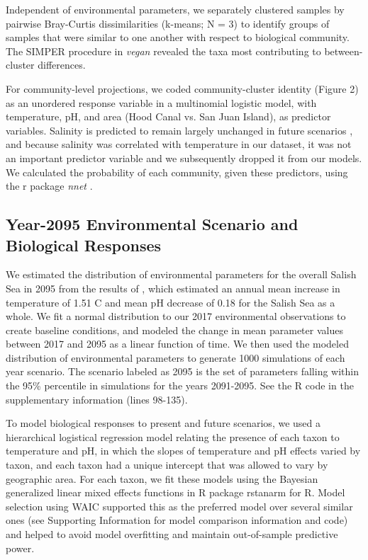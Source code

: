 \documentclass[11pt]{article}
\begin{document}
\begin{linenumbers}
Independent of environmental parameters, we separately clustered samples by pairwise Bray-Curtis dissimilarities (k-means; N = 3) to identify groups of samples that were similar to one another with respect to biological community. The SIMPER procedure in \textit{vegan} revealed the taxa most contributing to between-cluster differences.

For community-level projections, we coded community-cluster identity (Figure 2) as an unordered response variable in a multinomial logistic model, with temperature, pH, and area (Hood Canal vs. San Juan Island), as predictor variables. Salinity is predicted to remain largely unchanged in future scenarios \cite{khangaonkar2019salish}, and because salinity was correlated with temperature in our dataset, it was not an important predictor variable and we subsequently dropped it from our models. We calculated the probability of each community, given these predictors, using the r package \textit{nnet} \cite{nnet2002}.

\subsection*{Year-2095 Environmental Scenario and Biological Responses}

We estimated the distribution of environmental parameters for the overall Salish Sea in 2095 from the results of \cite{khangaonkar2019salish}, which estimated an annual mean increase in temperature of 1.51 \textdegree C and mean pH decrease of 0.18 for the Salish Sea as a whole. We fit a normal distribution to our 2017 environmental observations to create baseline conditions, and modeled the change in mean parameter values between 2017 and 2095 as a linear function of time. We then used the modeled distribution of environmental parameters to generate 1000 simulations of each year scenario. The scenario labeled as 2095 is the set of parameters falling within the 95\% percentile in simulations for the years 2091-2095. See the R code in the supplementary information (lines 98-135).

To model biological responses to present and future scenarios, we used a hierarchical logistical regression model relating the presence of each taxon to temperature and pH, in which the slopes of temperature and pH effects varied by taxon, and each taxon had a unique intercept that was allowed to vary by geographic area. For each taxon, we fit these models using the Bayesian generalized linear mixed effects functions in R package rstanarm \cite{rstanarm} for R. Model selection using WAIC \cite{watanabe2010asymptotic} supported this as the preferred model over several similar ones (see Supporting Information for model comparison information and code) and helped to avoid model overfitting and maintain out-of-sample predictive power. 


\end{linenumbers}
\end{document}
